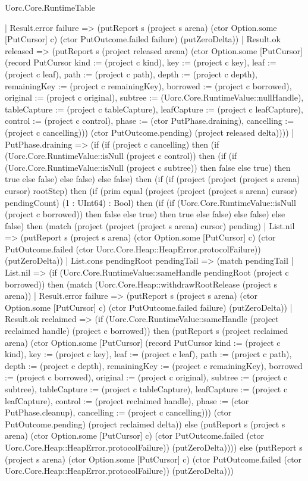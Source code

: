\begin{lexlean}{Uorc.Core.RuntimeTable}
\begin{semanticmodule}
{        | Result.error failure => (putReport s (project s arena) (ctor Option.some [PutCursor] c) (ctor PutOutcome.failed failure) (putZeroDelta))
        | Result.ok released => (putReport s (project released arena) (ctor Option.some [PutCursor] (record PutCursor {kind := (project c kind), key := (project c key), leaf := (project c leaf), path := (project c path), depth := (project c depth), remainingKey := (project c remainingKey), borrowed := (project c borrowed), original := (project c original), subtree := (Uorc.Core.RuntimeValue::nullHandle), tableCapture := (project c tableCapture), leafCapture := (project c leafCapture), control := (project c control), phase := (ctor PutPhase.draining), cancelling := (project c cancelling)})) (ctor PutOutcome.pending) (project released delta))))
      | PutPhase.draining => (if (if (project c cancelling) then (if (Uorc.Core.RuntimeValue::isNull (project c control)) then (if (if (Uorc.Core.RuntimeValue::isNull (project c subtree)) then false else true) then true else false) else false) else false) then (if (if (project (project (project s arena) cursor) rootStep) then (if (prim equal (project (project (project s arena) cursor) pendingCount) (1 : UInt64) : Bool) then (if (if (Uorc.Core.RuntimeValue::isNull (project c borrowed)) then false else true) then true else false) else false) else false) then (match (project (project (project s arena) cursor) pending)
        | List.nil => (putReport s (project s arena) (ctor Option.some [PutCursor] c) (ctor PutOutcome.failed (ctor Uorc.Core.Heap::HeapError.protocolFailure)) (putZeroDelta))
        | List.cons pendingRoot pendingTail => (match pendingTail
          | List.nil => (if (Uorc.Core.RuntimeValue::sameHandle pendingRoot (project c borrowed)) then (match (Uorc.Core.Heap::withdrawRootRelease (project s arena))
            | Result.error failure => (putReport s (project s arena) (ctor Option.some [PutCursor] c) (ctor PutOutcome.failed failure) (putZeroDelta))
            | Result.ok reclaimed => (if (Uorc.Core.RuntimeValue::sameHandle (project reclaimed handle) (project c borrowed)) then (putReport s (project reclaimed arena) (ctor Option.some [PutCursor] (record PutCursor {kind := (project c kind), key := (project c key), leaf := (project c leaf), path := (project c path), depth := (project c depth), remainingKey := (project c remainingKey), borrowed := (project c borrowed), original := (project c original), subtree := (project c subtree), tableCapture := (project c tableCapture), leafCapture := (project c leafCapture), control := (project reclaimed handle), phase := (ctor PutPhase.cleanup), cancelling := (project c cancelling)})) (ctor PutOutcome.pending) (project reclaimed delta)) else (putReport s (project s arena) (ctor Option.some [PutCursor] c) (ctor PutOutcome.failed (ctor Uorc.Core.Heap::HeapError.protocolFailure)) (putZeroDelta)))) else (putReport s (project s arena) (ctor Option.some [PutCursor] c) (ctor PutOutcome.failed (ctor Uorc.Core.Heap::HeapError.protocolFailure)) (putZeroDelta)))
}
\end{semanticmodule}
\end{lexlean}
